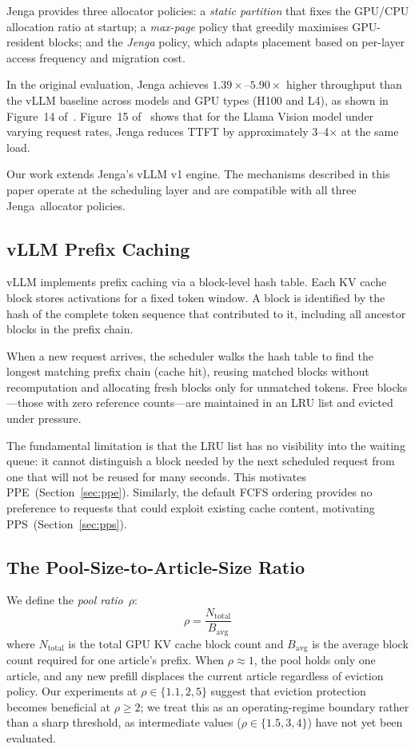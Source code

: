 \documentclass[journal]{IEEEtran}
\newcommand{\ppe}{\textsc{PPE}}
\newcommand{\pps}{\textsc{PPS}}
\newcommand{\jenga}{Jenga}
\begin{document}
Jenga provides three allocator policies: a \emph{static partition} that fixes
the GPU/CPU allocation ratio at startup; a \emph{max-page} policy that
greedily maximises GPU-resident blocks; and the \emph{Jenga} policy, which
adapts placement based on per-layer access frequency and migration cost.

In the original evaluation, Jenga achieves $1.39\times$--$5.90\times$ higher
throughput than the vLLM baseline across models and GPU types (H100 and L4),
as shown in Figure~14 of~\cite{jenga2025}. Figure~15 of~\cite{jenga2025}
shows that for the Llama Vision model under varying request rates, Jenga
reduces TTFT by approximately 3--4$\times$ at the same load.

Our work extends \jenga's vLLM v1 engine. The mechanisms described in this
paper operate at the scheduling layer and are compatible with all three
\jenga\ allocator policies.

\subsection{vLLM Prefix Caching}

vLLM implements prefix caching via a block-level hash table.  Each KV cache
block stores activations for a fixed token window.  A block is identified by
the hash of the complete token sequence that contributed to it, including all
ancestor blocks in the prefix chain.

When a new request arrives, the scheduler walks the hash table to find the
longest matching prefix chain (cache hit), reusing matched blocks without
recomputation and allocating fresh blocks only for unmatched tokens.  Free
blocks—those with zero reference counts—are maintained in an LRU list and
evicted under pressure.

The fundamental limitation is that the LRU list has no visibility into the
waiting queue: it cannot distinguish a block needed by the next scheduled
request from one that will not be reused for many seconds.  This motivates
\ppe\ (Section~\ref{sec:ppe}).  Similarly, the default FCFS ordering provides
no preference to requests that could exploit existing cache content, motivating
\pps\ (Section~\ref{sec:pps}).

\subsection{The Pool-Size-to-Article-Size Ratio}
\label{sec:rho}

We define the \emph{pool ratio}~$\rho$:
\begin{equation}
  \rho = \frac{N_{\mathrm{total}}}{B_{\mathrm{avg}}}
  \label{eq:rho}
\end{equation}
where $N_{\mathrm{total}}$ is the total GPU KV cache block count and
$B_{\mathrm{avg}}$ is the average block count required for one article's
prefix.  When $\rho\approx1$, the pool holds only one article, and any new
prefill displaces the current article regardless of eviction policy.  Our
experiments at $\rho\in\{1.1, 2, 5\}$ suggest that eviction protection
becomes beneficial at $\rho\geq2$; we treat this as an operating-regime
boundary rather than a sharp threshold, as intermediate values
($\rho\in\{1.5, 3, 4\}$) have not yet been evaluated.
\end{document}
